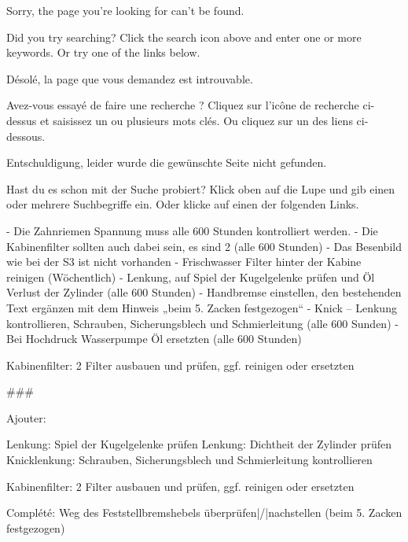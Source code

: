Sorry, the page you’re looking for can’t be found.

Did you try searching? Click the search icon above and enter one or more keywords. Or try one of the links below.





Désolé, la page que vous demandez est introuvable.

Avez-vous essayé de faire une recherche ? Cliquez sur l’icône de recherche ci-dessus et saisissez un ou plusieurs mots clés. Ou cliquez sur un des liens ci-dessous.





Entschuldigung, leider wurde die gewünschte Seite nicht gefunden.

Hast du es schon mit der Suche probiert? Klick oben auf die Lupe und gib einen oder mehrere Suchbegriffe ein. Oder klicke auf einen der folgenden Links.


- Die Zahnriemen Spannung muss alle 600 Stunden kontrolliert werden.
- Die Kabinenfilter sollten auch dabei sein, es sind 2 (alle 600 Stunden)
- Das Besenbild wie bei der S3 ist nicht vorhanden
- Frischwasser Filter hinter der Kabine reinigen (Wöchentlich)
- Lenkung, auf Spiel der Kugelgelenke prüfen und Öl Verlust der Zylinder (alle 600 Stunden)
- Handbremse einstellen, den bestehenden Text ergänzen mit dem Hinweis „beim 5. Zacken festgezogen“
- Knick – Lenkung kontrollieren, Schrauben, Sicherungsblech und Schmierleitung (alle 600 Sunden)
- Bei Hochdruck Wasserpumpe Öl ersetzten (alle 600 Stunden)

Kabinenfilter: 2 Filter ausbauen und prüfen, ggf. reinigen oder ersetzten

###

Ajouter:

\bTR \bTD \Tfun \eTD \bTD Lenkung: Spiel der Kugelgelenke prüfen \eTD \bTD \Tcheck \eTD \bTD \emptY \eTD \eTR
\bTR \bTD \Tfun \eTD \bTD Lenkung: Dichtheit der Zylinder prüfen \eTD \bTD \Tcheck \eTD \bTD \emptY \eTD \eTR
\bTR \bTD \Tfun \eTD \bTD Knicklenkung: Schrauben, Sicherungsblech und Schmierleitung kontrollieren \eTD \bTD \Tcheck \eTD \bTD \emptY \eTD \eTR


\bTR \bTD \Tgen \eTD \bTD Kabinenfilter: 2 Filter ausbauen und prüfen, ggf. reinigen oder ersetzten \eTD \bTD \Tcheck \eTD \bTD \emptY \eTD \eTR


Complété:
\bTR \bTD \Tgen \eTD \bTD Weg des Feststellbremshebels überprüfen|/|nachstellen (beim 5. Zacken festgezogen)\eTD \bTD \Tpro \eTD \bTD \emptY \eTD \eTR
